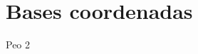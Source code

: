 \documentclass[../main.tex]{subfiles}
\begin{document}
\section{Bases coordenadas}
Peo 2
 
\end{document}
